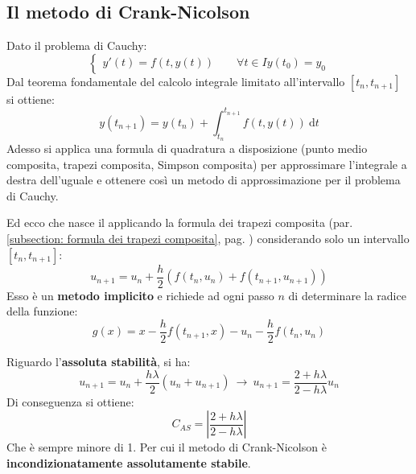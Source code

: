 \subsection{Il metodo di Crank-Nicolson}\label{subsection: il metodo di Crank-Nicolson}

Dato il problema di Cauchy:
\begin{equation*}
	\begin{cases}
		y'\left(t\right) = f\left(t, y\left(t\right)\right) \hspace{2em} \forall t \in I
		y\left(t_{0}\right) = y_{0}
	\end{cases}
\end{equation*}
Dal teorema fondamentale del calcolo integrale limitato all'intervallo $\left[t_{n}, t_{n+1}\right]$ si ottiene:
\begin{equation*}
	y\left(t_{n+1}\right) = y\left(t_{n}\right) + \displaystyle\int_{t_{n}}^{t_{n+1}} f\left(t, y\left(t\right)\right) \: \mathrm{d}t
\end{equation*}
Adesso si applica una formula di quadratura a disposizione (punto medio composita, trapezi composita, Simpson composita) per approssimare l'integrale a destra dell'uguale e ottenere così un metodo di approssimazione per il problema di Cauchy.

\highspace
Ed ecco che nasce il  applicando la formula dei trapezi composita (par. \ref{subsection: formula dei trapezi composita}, pag. \pageref{subsection: formula dei trapezi composita}) considerando solo un intervallo $\left[t_{n}, t_{n+1}\right]$:
\begin{equation}
	u_{n+1} = u_{n} + \dfrac{h}{2}\left(f\left(t_{n}, u_{n}\right) + f\left(t_{n+1}, u_{n+1}\right)\right)
\end{equation}
Esso è un \textbf{metodo implicito} e richiede ad ogni passo $n$ di determinare la radice della funzione:
\begin{equation*}
	g\left(x\right) = x - \dfrac{h}{2} f\left(t_{n+1}, x\right) - u_{n} - \dfrac{h}{2} f\left(t_{n}, u_{n}\right)
\end{equation*}

\highspace
Riguardo l'\textbf{assoluta stabilità}, si ha:
\begin{equation*}
	u_{n+1} = u_{n} + \dfrac{h \lambda}{2}\left(u_{n} + u_{n+1}\right) \: \rightarrow \: u_{n+1} = \dfrac{2+h\lambda}{2-h\lambda} u_{n}
\end{equation*}
Di conseguenza si ottiene:
\begin{equation*}
	C_{AS} = \left|\dfrac{2+h\lambda}{2-h\lambda}\right|
\end{equation*}
Che è sempre minore di 1. Per cui il metodo di Crank-Nicolson è \textbf{incondizionatamente assolutamente stabile}.